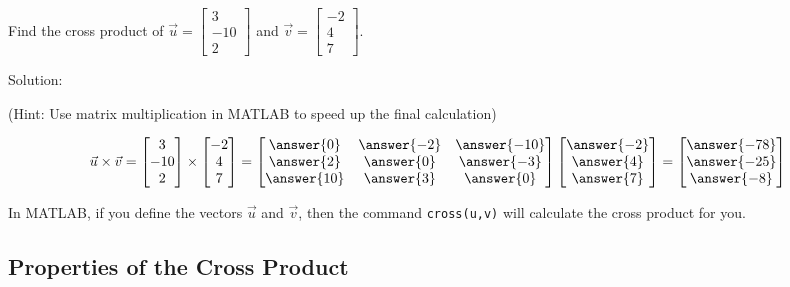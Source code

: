 \documentclass{ximera}
\begin{document}
 
\begin{example}\label{ex:crossproduct}
Find the cross product of $\vec{u}=\begin{bmatrix}3\\ -10\\ 2\end{bmatrix}$ and $\vec{v}=\begin{bmatrix}-2\\ 4\\ 7\end{bmatrix}$.

Solution:

  (Hint: Use matrix multiplication in MATLAB to speed up the final calculation)

$$\vec{u}\times \vec{v}=\begin{bmatrix}3\\ -10\\ 2\end{bmatrix}\times\begin{bmatrix}-2\\ 4\\ 7\end{bmatrix}=\begin{bmatrix}\answer{0} & \answer{-2} & \answer{-10} \\
\answer{2} & \answer{0} & \answer{-3} \\
\answer{10} & \answer{3} & \answer{0}
\end{bmatrix}
\begin{bmatrix}
\answer{-2} \\ \answer{4} \\ \answer{7}
\end{bmatrix}
=
\begin{bmatrix}
\answer{-78} \\ \answer{-25} \\ \answer{-8}
\end{bmatrix}$$


\end{example}

In MATLAB, if you define the vectors $\vec{u}$ and $\vec{v}$, then the command \texttt{cross(u,v)} will calculate the cross product for you.
 
\subsection*{Properties of the Cross Product}
 
 
\end{document}
